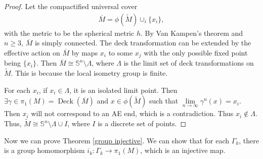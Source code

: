 \documentclass[12pt]{amsart}
\theoremstyle{definition}
\begin{document}
\begin{proof}
  Let the compactified universal cover
  \begin{align*}
      \overline{M}=\phi(\tilde{M})\cup_i \{x_i\},
  \end{align*}
  with the metric to be the spherical metric $h$. By Van Kampen's theorem and $n\geq 3$, $\overline{M}$ is simply connected. The deck transformation can be extended by the effective action on $\overline{M}$ by maps $x_i$ to some $x_j$ with the only possible fixed point being $\{x_i\}$. Then $\overline{M}\cong\mathbb{S}^n\setminus\Lambda$, where $\Lambda$ is the limit set of deck transformations on $\tilde{M}$. This is because the local isometry group is finite. 
  
  For each $x_i$, if $x_i\in \Lambda$, it is an isolated limit point. Then $\exists \gamma\in\pi_1(M)=\operatorname{Deck}(\overline{M})$ and $x\in \phi(\tilde{M})$ such that $\lim\limits_{n\to\infty}\gamma^n(x)=x_i$. Then $x_i$ will not correspond to an AE end, which is a contradiction. Thus $x_i\notin\Lambda$. Thus, $\tilde{M}\cong \mathbb{S}^n\setminus\Lambda\cup I$, where $I$ is a discrete set of points.
\end{proof}

Now we can prove Theorem \ref{group injective}. We can show that for each $\Gamma_k$, there is a group homomorphism $i_k:\Gamma_k\to\pi_1(M)$, which is an injective map.
\end{document}
